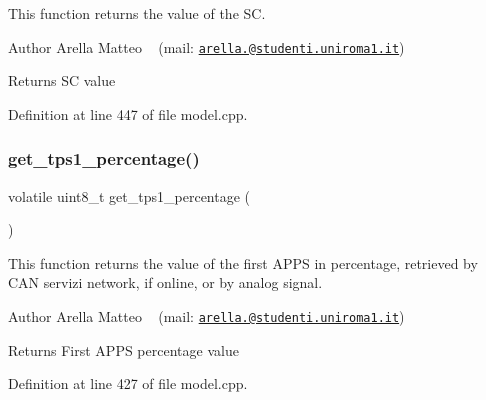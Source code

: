 This function returns the value of the SC. 

\begin{DoxyAuthor}{Author}
Arella Matteo ~\newline
 (mail\+: \href{mailto:arella.1646983@studenti.uniroma1.it}{\tt arella.@studenti.\+uniroma1.\+it})
\end{DoxyAuthor}
\begin{DoxyReturn}{Returns}
SC value 
\end{DoxyReturn}


Definition at line 447 of file model.\+cpp.

\mbox{\label{group___board__model__group_ga9239a95f68fab3d9b6832fbe85eb87cd}} 
\subsubsection{\texorpdfstring{get\+\_\+tps1\+\_\+percentage()}{get\_tps1\_percentage()}}
{\footnotesize\ttfamily volatile uint8\+\_\+t get\+\_\+tps1\+\_\+percentage (\begin{DoxyParamCaption}{ }\end{DoxyParamCaption})}



This function returns the value of the first A\+P\+PS in percentage, retrieved by C\+AN servizi network, if online, or by analog signal. 

\begin{DoxyAuthor}{Author}
Arella Matteo ~\newline
 (mail\+: \href{mailto:arella.1646983@studenti.uniroma1.it}{\tt arella.@studenti.\+uniroma1.\+it})
\end{DoxyAuthor}
\begin{DoxyReturn}{Returns}
First A\+P\+PS percentage value 
\end{DoxyReturn}


Definition at line 427 of file model.\+cpp.

\mbox{\label{group___board__model__group_gae563bbe9e3c31913df498ebd7cbf6c10}} 
